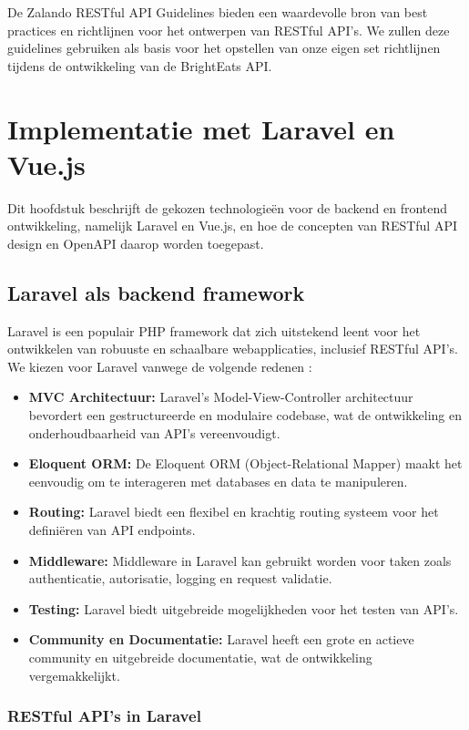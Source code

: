 De Zalando RESTful API Guidelines bieden een waardevolle bron van best practices en richtlijnen voor het ontwerpen van RESTful API's. We zullen deze guidelines gebruiken als basis voor het opstellen van onze eigen set richtlijnen tijdens de ontwikkeling van de Bright\-Eats API.

\section{Implementatie met Laravel en Vue.js}

Dit hoofdstuk beschrijft de gekozen technologieën voor de backend en frontend ontwikkeling, namelijk Laravel en Vue.js, en hoe de concepten van RESTful API design en OpenAPI daarop worden toegepast.

\subsection{Laravel als backend framework}

Laravel is een populair PHP framework dat zich uitstekend leent voor het ontwikkelen van robuuste en schaalbare webapplicaties, inclusief RESTful API's. We kiezen voor Laravel vanwege de volgende redenen \autocite{Laravel}:

\begin{itemize}
  \item \textbf{MVC Architectuur:} Laravel's Model-View-Controller architectuur bevordert een gestructureerde en modulaire codebase, wat de ontwikkeling en onderhoudbaarheid van API's vereenvoudigt.
  \item \textbf{Eloquent ORM:} De Eloquent ORM (Object-Relational Mapper) maakt het eenvoudig om te interageren met databases en data te manipuleren.
  \item \textbf{Routing:} Laravel biedt een flexibel en krachtig routing systeem voor het definiëren van API endpoints.
  \item \textbf{Middleware:} Middleware in Laravel kan gebruikt worden voor taken zoals authenticatie, autorisatie, logging en request validatie.
  \item \textbf{Testing:} Laravel biedt uitgebreide mogelijkheden voor het testen van API's.
  \item \textbf{Community en Documentatie:} Laravel heeft een grote en actieve community en uitgebreide documentatie, wat de ontwikkeling vergemakkelijkt.
\end{itemize}

\subsubsection{RESTful API's in Laravel}

